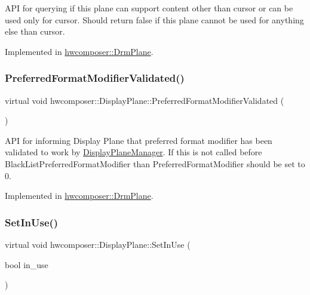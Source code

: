 A\+PI for querying if this plane can support content other than cursor or can be used only for cursor. Should return false if this plane cannot be used for anything else than cursor. 

Implemented in \mbox{\hyperlink{classhwcomposer_1_1DrmPlane_a25b4218371d1c5984777b74553b554a4}{hwcomposer\+::\+Drm\+Plane}}.

\mbox{\label{classhwcomposer_1_1DisplayPlane_a8d2d4175bec7646f1f4216d3488bb2f6}} 
\subsubsection{\texorpdfstring{Preferred\+Format\+Modifier\+Validated()}{PreferredFormatModifierValidated()}}
{\footnotesize\ttfamily virtual void hwcomposer\+::\+Display\+Plane\+::\+Preferred\+Format\+Modifier\+Validated (\begin{DoxyParamCaption}{ }\end{DoxyParamCaption})\hspace{0.3cm}{\ttfamily [pure virtual]}}

A\+PI for informing Display Plane that preferred format modifier has been validated to work by \mbox{\hyperlink{classhwcomposer_1_1DisplayPlaneManager}{Display\+Plane\+Manager}}. If this is not called before Black\+List\+Preferred\+Format\+Modifier than Preferred\+Format\+Modifier should be set to 0. 

Implemented in \mbox{\hyperlink{classhwcomposer_1_1DrmPlane_a476d9d42a81eddb775bb285cc1c68cfb}{hwcomposer\+::\+Drm\+Plane}}.

\mbox{\label{classhwcomposer_1_1DisplayPlane_a6f74f9f29977ae00d534f2488505d7d7}} 
\subsubsection{\texorpdfstring{Set\+In\+Use()}{SetInUse()}}
{\footnotesize\ttfamily virtual void hwcomposer\+::\+Display\+Plane\+::\+Set\+In\+Use (\begin{DoxyParamCaption}\item[{bool}]{in\+\_\+use }\end{DoxyParamCaption})\hspace{0.3cm}{\ttfamily [pure virtual]}}



